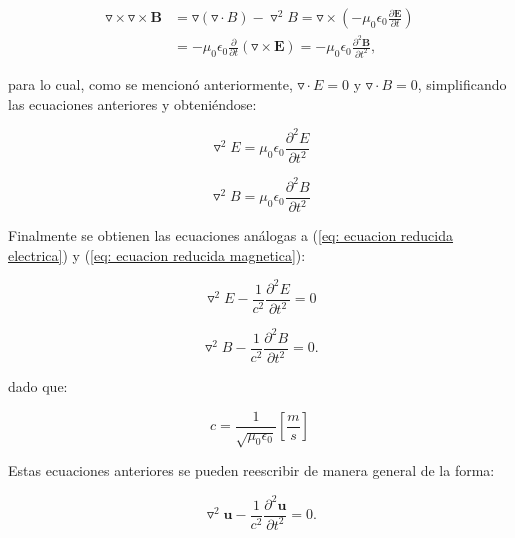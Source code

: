 \documentclass[12pt,letterpaper]{report}
\numberwithin{equation}{section}
\begin{document}
\begin{equation*}
\begin{split}
\triangledown\times\triangledown\times\textbf{B} &= \triangledown(\triangledown\cdot B)-\triangledown^2B=\triangledown\times\left(-\mu_0\epsilon_0\frac{\partial \textbf{E}}{\partial t}\right)\\
&= -\mu_0\epsilon_0\frac{\partial}{\partial t}(\triangledown\times\textbf{E})=-\mu_0\epsilon_0\frac{\partial^2\textbf{B}}{\partial t^2},
\end{split}
\end{equation*}

\noindent para lo cual, como se mencionó anteriormente, $\triangledown\cdot E = 0$ y $\triangledown\cdot B = 0$, simplificando las ecuaciones anteriores y obteniéndose:


\begin{equation}
\triangledown^2E = \mu_0\epsilon_0\frac{\partial^2E}{\partial t^2}
\label{eq: ecuacion reducida electrica}
\end{equation}

\begin{equation}
\triangledown^2B = \mu_0\epsilon_0\frac{\partial^2B}{\partial t^2}
\label{eq: ecuacion reducida magnetica}
\end{equation}

\noindent Finalmente se obtienen las ecuaciones análogas a (\ref{eq: ecuacion reducida electrica}) y (\ref{eq: ecuacion reducida magnetica}):


\begin{equation}
\triangledown^2E - \frac{1}{c^2}\frac{\partial^2E}{\partial t^2}= 0
\label{eq: ecuacion onda electrica}
\end{equation}

\begin{equation}
\triangledown^2B - \frac{1}{c^2}\frac{\partial^2B}{\partial t^2}= 0.
\label{eq: ecuacion onda magnetica}
\end{equation}

\noindent dado que:

$$c = \frac{1}{\sqrt{\mu_0\epsilon_0}} \left[\frac{m}{s}\right]$$

\noindent Estas ecuaciones anteriores se pueden reescribir de manera general de la forma:

\begin{equation}
\triangledown^2\textbf{u} - \frac{1}{c^2}\frac{\partial^2\textbf{u}}{\partial t^2}= 0.
\label{eq: ecuacion onda}
\end{equation} 
\end{document}
